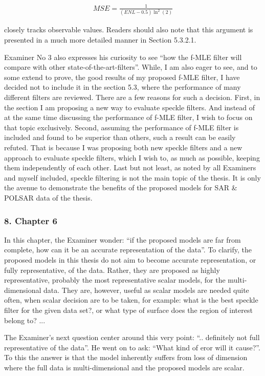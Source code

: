 \begin{align*}
  MSE = \frac{1}{(ENL-0.5)\ln^2(2)}
\end{align*}  

closely tracks observable values.
Readers should also note that this argument is presented in a much more detailed manner in Section 5.3.2.1.

Examiner No 3 also expresses his curiosity to see ``how the f-MLE filter will compare with other state-of-the-art-filters''.
While, I am also eager to see, and to some extend to prove, the good results of my proposed f-MLE filter,
  I have decided not to include it in the section 5.3, where the performance of many different filters are reviewed.
There are a few reasons for such a decision.
First, in the section I am proposing a new way to evaluate speckle filters.
And instead of at the same time discussing the performance of f-MLE filter, I wish to focus on that topic exclusively.
Second, assuming the performance of f-MLE filter is included and found to be superior than others,
  such a result can be easily refuted.
That is because I was proposing both new speckle filters and a new approach to evaluate speckle filters,
  which I wish to, as much as possible, keeping them independently of each other.
Last but not least, as noted by all Examiners and myself included, speckle filtering is not the main topic of the thesis.
It is only the avenue to demonstrate the benefits of the proposed models for SAR \& POLSAR data of the thesis.

\subsubsection*{8. Chapter 6}

In this chapter, the Examiner wonder: ``if the proposed models are far from complete, how can it be an accurate representation of the data''.
To clarify, the proposed models in this thesis do not aim to become accurate representation, or fully representative, of the data.
Rather, they are proposed as highly representative, probably the most representative scalar models, for the multi-dimensional data.
They are, however, useful as scalar models are needed quite often, when scalar decision are to be taken,
  for example: what is the best speckle filter for the given data set?, or what type of surface does the region of interest belong to? ...

The Examiner's next question center around this very point: ``.. definitely not full representative of the data''.
He went on to ask: ``What kind of eror will it cause?''.
To this the answer is that the model inherently suffers from loss of dimension
  where the full data is multi-dimensional and the proposed models are scalar.

